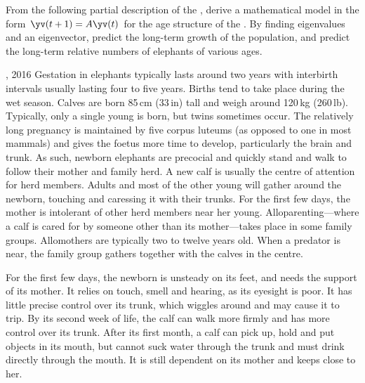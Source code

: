 \begin{exercise}  
From the following partial description of the , 
derive a mathematical model in the form \(\yv(t+1)=A\yv(t)\) for the age structure of the .
By finding eigenvalues and an eigenvector, predict the long-term growth of the population, and predict the long-term relative numbers of elephants of various ages.
\begin{quoted}{, 2016}
Gestation in elephants typically lasts around two years with interbirth intervals usually lasting four to five years. Births tend to take place during the wet season. Calves are born 85\,cm (33\,in) tall and weigh around 120\,kg (260\,lb). Typically, only a single young is born, but twins sometimes occur.  The relatively long pregnancy is maintained by five corpus luteums (as opposed to one in most mammals) and gives the foetus more time to develop, particularly the brain and trunk. As such, newborn elephants are precocial and quickly stand and walk to follow their mother and family herd.  A new calf is usually the centre of attention for herd members.  Adults and most of the other young will gather around the newborn, touching and caressing it with their trunks.  For the first few days, the mother is intolerant of other herd members near her young.  Alloparenting---where a calf is cared for by someone other than its mother---takes place in some family groups.  Allomothers are typically two to twelve years old. When a predator is near, the family group gathers together with the calves in the centre.

For the first few days, the newborn is unsteady on its feet, and needs the support of its mother. It relies on touch, smell and hearing, as its eyesight is poor. It has little precise control over its trunk, which wiggles around and may cause it to trip. By its second week of life, the calf can walk more firmly and has more control over its trunk. After its first month, a calf can pick up, hold and put objects in its mouth, but cannot suck water through the trunk and must drink directly through the mouth. It is still dependent on its mother and keeps close to her.


\end{quoted}
\end{exercise}
